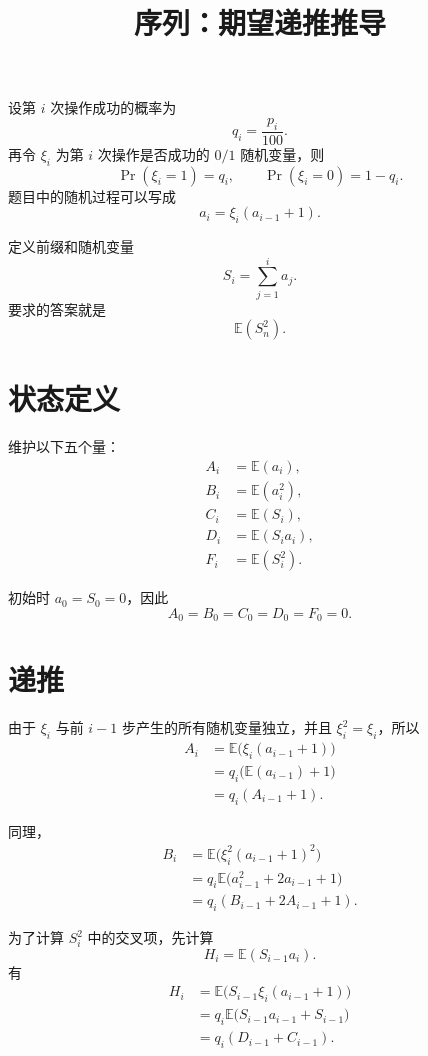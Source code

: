 \documentclass[UTF8]{ctexart}
\title{序列：期望递推推导}
\author{}
\date{}
\begin{document}
\maketitle

设第 $i$ 次操作成功的概率为
\[
q_i=\frac{p_i}{100}.
\]
再令 $\xi_i$ 为第 $i$ 次操作是否成功的 $0/1$ 随机变量，则
\[
\Pr(\xi_i=1)=q_i,
\qquad
\Pr(\xi_i=0)=1-q_i.
\]
题目中的随机过程可以写成
\[
a_i=\xi_i(a_{i-1}+1).
\]

定义前缀和随机变量
\[
S_i=\sum_{j=1}^{i}a_j.
\]
要求的答案就是
\[
\mathbb E(S_n^2).
\]

\section*{状态定义}

维护以下五个量：
\[
\begin{aligned}
A_i&=\mathbb E(a_i),\\
B_i&=\mathbb E(a_i^2),\\
C_i&=\mathbb E(S_i),\\
D_i&=\mathbb E(S_i a_i),\\
F_i&=\mathbb E(S_i^2).
\end{aligned}
\]

初始时 $a_0=S_0=0$，因此
\[
A_0=B_0=C_0=D_0=F_0=0.
\]

\section*{递推}

由于 $\xi_i$ 与前 $i-1$ 步产生的所有随机变量独立，并且
$\xi_i^2=\xi_i$，所以
\[
\begin{aligned}
A_i
&=\mathbb E\bigl(\xi_i(a_{i-1}+1)\bigr)\\
&=q_i\bigl(\mathbb E(a_{i-1})+1\bigr)\\
&=q_i(A_{i-1}+1).
\end{aligned}
\]

同理，
\[
\begin{aligned}
B_i
&=\mathbb E\bigl(\xi_i^2(a_{i-1}+1)^2\bigr)\\
&=q_i\mathbb E\bigl(a_{i-1}^2+2a_{i-1}+1\bigr)\\
&=q_i(B_{i-1}+2A_{i-1}+1).
\end{aligned}
\]

为了计算 $S_i^2$ 中的交叉项，先计算
\[
H_i=\mathbb E(S_{i-1}a_i).
\]
有
\[
\begin{aligned}
H_i
&=\mathbb E\bigl(S_{i-1}\xi_i(a_{i-1}+1)\bigr)\\
&=q_i\mathbb E\bigl(S_{i-1}a_{i-1}+S_{i-1}\bigr)\\
&=q_i(D_{i-1}+C_{i-1}).
\end{aligned}
\]
\end{document}
